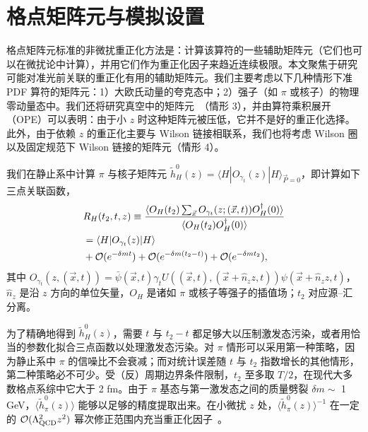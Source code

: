 \section{格点矩阵元与模拟设置}\label{sec:setup}

格点矩阵元标准的非微扰重正化方法是：计算该算符的一些辅助矩阵元（它们也可以在微扰论中计算），并用它们作为重正化因子来趋近连续极限。本文聚焦于研究可能对准光前关联的重正化有用的辅助矩阵元。我们主要考虑以下几种情形下准 PDF 算符的矩阵元：1）大欧氏动量的夸克态中；2）强子（如 $\pi$ 或核子）的物理零动量态中。我们还将研究真空中的矩阵元~\cite{Braun:2018brg}（情形 3），并由算符乘积展开（OPE）可以表明：由于小 $z$ 时这种矩阵元被压低，它并不是好的重正化选择。此外，由于依赖 $z$ 的重正化主要与 Wilson 链接相联系，我们也将考虑 Wilson 圈以及固定规范下 Wilson 链接的矩阵元（情形 4）。

我们在静止系中计算 $\pi$ 与核子矩阵元 $\tilde{h}^{0}_{H}(z)=\langle H| O_{\gamma_t}(z)|H \rangle_{\vec{P}=0}$，即计算如下三点关联函数，
\begin{align}\label{eq:hadron}
&R_{H}(t_2,t,z)\equiv\frac{\langle O_H(t_2)\sum_{\vec{x}}O_{\gamma_t}(z;(\vec{x},t))O_H^{\dagger}(0)\rangle}{\langle O_H(t_2)O_H^{\dagger}(0)\rangle}\nonumber\\
&=\langle H| O_{\gamma_t}(z)|H \rangle\nonumber\\
&+{\cal O}(e^{-\delta m t})+{\cal O}(e^{-\delta m (t_2-t)})+{\cal O}(e^{-\delta m t_2}),
\end{align}
其中 $O_{\gamma_t}(z,(\vec{x},t))=\bar{\psi}(\vec{x},t) \gamma_t U((\vec{x},t),(\vec{x}+\hat{n}_z z,t)) \psi (\vec{x}+\hat{n}_z z,t)$，$\hat{n}_z$ 是沿 $z$ 方向的单位矢量，$O_H$ 是诸如 $\pi$ 或核子等强子的插值场；$t_2$ 对应源--汇分离。

为了精确地得到 $\tilde{h}^0_{H}(z)$，需要 $t$ 与 $t_2-t$ 都足够大以压制激发态污染，或者用恰当的参数化拟合三点函数以处理激发态污染。对 $\pi$ 情形可以采用第一种策略，因为静止系中 $\pi$ 的信噪比不会衰减；而对统计误差随 $t$ 与 $t_2$ 指数增长的其他情形，第二种策略必不可少。受（反）周期边界条件限制，$t_2$ 至多取 $T/2$，在现代大多数格点系综中它大于 2 fm。由于 $\pi$ 基态与第一激发态之间的质量劈裂 $\delta m\sim $ 1 GeV，$\langle \tilde{h}^0_{\pi}(z)\rangle$ 能够以足够的精度提取出来。在小微扰 $z$ 处，$\langle \tilde{h}^0_{\pi}(z)\rangle^{-1}$ 在一定的 ${\cal O}(\Lambda_{\rm QCD}^2z^2)$ 幂次修正范围内充当重正化因子~\cite{Orginos:2017kos}。

